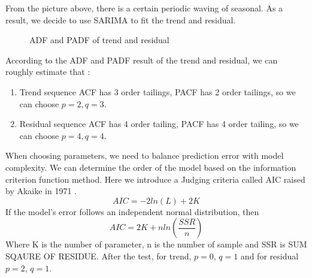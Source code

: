 \documentclass{mcmthesis}
\begin{document}
From the picture above, there is a certain periodic waving of seasonal. As a result, we decide to use SARIMA to fit the trend and residual.
\begin{figure}[htbp]
\centering
{}
\quad
{}
\caption{ADF and PADF of trend and residual}
\end{figure}
According to the ADF and PADF result of the trend and residual, we can roughly estimate that :
\begin{enumerate}[(1)]
\item Trend sequence ACF has 3 order tailings, PACF has 2 order tailings, so we can choose $p = 2, q = 3$.
\item Residual sequence ACF has 4 order tailing, PACF has 4 order tailing, so we can choose $p = 4, q = 4$.
\end{enumerate}
When choosing parameters, we need to balance prediction error with model complexity. We can determine the order of the model based on the information criterion function method. Here we introduce a Judging criteria called AIC raised by Akaike in 1971 \cite{9}.
\begin{equation} AIC = -2ln(L) + 2K\end{equation}
If the model's error follows an independent normal distribution, then
\begin{equation} AIC = 2K + nln(\frac{SSR}{n})\end{equation}
Where K is the number of parameter, n is the number of sample and SSR is SUM SQAURE OF RESIDUE. After the test, for trend, $p = 0$, $q = 1$ and for residual $p = 2$, $q =1$.\\
\end{document}
